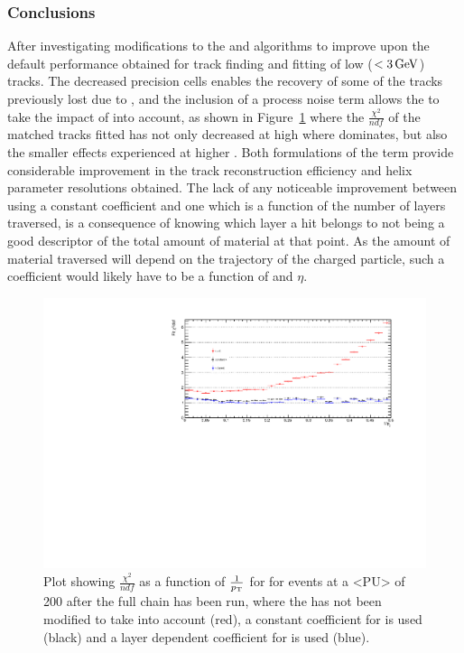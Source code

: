 \subsubsection{Conclusions}\label{subsubsec:2GevConclusions}
After investigating modifications to the \HT and \KF algorithms to improve upon the default performance obtained for track finding and fitting of low \pT ($< 3\,\text{Ge\hspace{-.08em}V}$) tracks.
The decreased precision \HT cells enables the recovery of some of the tracks previously lost due to \MS, and the inclusion of a process noise term allows the \KF to take the impact of \MS into account, as shown in Figure~\ref{fig:2GeVTiltChi2Ndf} where the $\frac{\chi^{2}}{ndf}$ of the matched tracks fitted has not only decreased at high \pT where \MS dominates, but also the smaller effects experienced at higher \pT.
Both formulations of the \MS term provide considerable improvement in the track reconstruction efficiency and helix parameter resolutions obtained.
The lack of any noticeable improvement between using a constant \MS coefficient and one which is a function of the number of layers traversed, is a consequence of knowing which layer a hit belongs to not being a good descriptor of the total amount of material at that point.
As the amount of material traversed will depend on the trajectory of the charged particle, such a coefficient would likely have to be a function of \pt and $\eta$.

\begin{figure}[tbp]
\centering
\includegraphics[width=\textwidth]{figs/tk-upgrade/results-lowPtTracking/kfChi2NdfVsInvPtTiltedGeometry_5000.pdf}
\caption{Plot showing $\frac{\chi^{2}}{ndf}$ as a function of $\frac{1}{p_{\mathrm{T}}}$ for for \ttbar events at a <PU> of 200 after the full chain has been run, where the \KF has not been modified to take \MS into account (red), a constant coefficient for \MS is used (black) and a layer dependent coefficient for \MS is used (blue).
}
\label{fig:2GeVTiltChi2Ndf}	
\end{figure}
